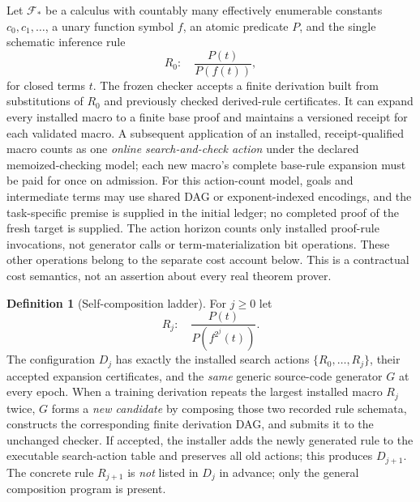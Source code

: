 \documentclass[11pt,letterpaper]{article}
\theoremstyle{definition}
\newtheorem{definition}[theorem]{Definition}
\theoremstyle{remark}
\begin{document}
Let $\mathcal F_*$ be a calculus with countably many effectively enumerable constants $c_0,c_1,\ldots$, a unary function symbol $f$, an atomic predicate $P$, and the single schematic inference rule
\[
 R_0:\quad \frac{P(t)}{P(f(t))},
\]
for closed terms $t$. The frozen checker accepts a finite derivation built from substitutions of $R_0$ and previously checked derived-rule certificates. It can expand every installed macro to a finite base proof and maintains a versioned receipt for each validated macro. A subsequent application of an installed, receipt-qualified macro counts as one \emph{online search-and-check action} under the declared memoized-checking model; each new macro's complete base-rule expansion must be paid for once on admission. For this action-count model, goals and intermediate terms may use shared DAG or exponent-indexed encodings, and the task-specific premise is supplied in the initial ledger; no completed proof of the fresh target is supplied. The action horizon counts only installed proof-rule invocations, not generator calls or term-materialization bit operations. These other operations belong to the separate cost account below. This is a contractual cost semantics, not an assertion about every real theorem prover.

\begin{definition}[Self-composition ladder]\label{def:ladder}
For $j\geq0$ let
\[
 R_j:\quad \frac{P(t)}{P(f^{2^j}(t))}.
\]
The configuration $D_j$ has exactly the installed search actions $\{R_0,\ldots,R_j\}$, their accepted expansion certificates, and the \emph{same} generic source-code generator $G$ at every epoch. When a training derivation repeats the largest installed macro $R_j$ twice, $G$ forms a \emph{new candidate} by composing those two recorded rule schemata, constructs the corresponding finite derivation DAG, and submits it to the unchanged checker. If accepted, the installer adds the newly generated rule to the executable search-action table and preserves all old actions; this produces $D_{j+1}$. The concrete rule $R_{j+1}$ is \emph{not} listed in $D_j$ in advance; only the general composition program is present.
\end{definition}
\end{document}
